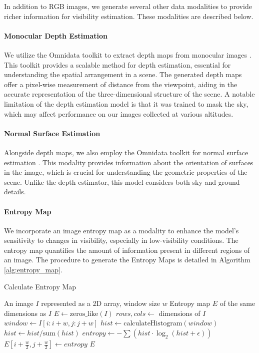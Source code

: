 In addition to RGB images, we generate several other data modalities to provide richer information for visibility estimation. These modalities are described below.

\paragraph{Monocular Depth Estimation}
We utilize the Omnidata toolkit to extract depth maps from monocular images \cite{eftekhar2021omnidata}. This toolkit provides a scalable method for depth estimation, essential for understanding the spatial arrangement in a scene. The generated depth maps offer a pixel-wise measurement of distance from the viewpoint, aiding in the accurate representation of the three-dimensional structure of the scene. A notable limitation of the depth estimation model is that it was trained to mask the sky, which may affect performance on our images collected at various altitudes.

\paragraph{Normal Surface Estimation}
Alongside depth maps, we also employ the Omnidata toolkit for normal surface estimation \cite{eftekhar2021omnidata}. This modality provides information about the orientation of surfaces in the image, which is crucial for understanding the geometric properties of the scene. Unlike the depth estimator, this model considers both sky and ground details.

\paragraph{Entropy Map}
We incorporate an image entropy map as a modality to enhance the model's sensitivity to changes in visibility, especially in low-visibility conditions. The entropy map quantifies the amount of information present in different regions of an image. The procedure to generate the Entropy Maps is detailed in Algorithm \ref{alg:entropy_map}.

\begin{algorithm}[htbp]
\caption{Calculate Entropy Map}\label{alg:entropy_map}
\begin{algorithmic}[1]
\Require An image $I$ represented as a 2D array, window size $w$
\Ensure Entropy map $E$ of the same dimensions as $I$
\State $E \gets \text{zeros\_like}(I)$ 
\State $rows, cols \gets$ dimensions of $I$
        \State $window \gets I[i : i+w, j : j+w]$
        \State $hist \gets \text{calculateHistogram}(window)$
        \State $hist \gets hist / \text{sum}(hist)$
        \State $entropy \gets -\sum (hist \cdot \log_2(hist + \epsilon))$
        \State $E[i + \frac{w}{2}, j + \frac{w}{2}] \gets entropy$
    \EndFor
\EndFor
\State \Return $E$
\end{algorithmic}
\end{algorithm}

